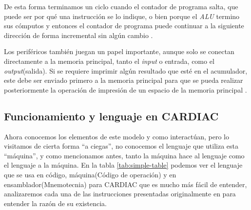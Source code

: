 \documentclass[letterpaper,12pt,oneside]{book}
\begin{document}
	De esta forma terminamos un ciclo cuando el contador de programa salta, que puede ser por qué una instrucción se lo indique, o bien porque
	el \textit{ALU} termino sus cómputos y entonces el contador de programa puede continuar a la siguiente dirección de forma incremental
	sin algún cambio \cite{hegelbarger_instruction_1968}.
	
	Los periféricos también juegan un papel importante, aunque solo se conectan directamente a la memoria principal, tanto el \textit{input} o entrada,
	como el \textit{output}(salida). Si se requiere imprimir algún resultado que esté en el acumulador, este debe ser enviado primero
	a la memoria principal para que se pueda realizar posteriormente la operación de impresión de un espacio de la memoria principal 
	\cite{hegelbarger_instruction_1968}.
	
	\subsection{Funcionamiento y lenguaje en CARDIAC}	
	
	Ahora conocemos los elementos de este modelo y como interactúan, pero lo visitamos de cierta forma ``a ciegas'', no conocemos el lenguaje
	que utiliza esta ``máquina'', y como mencionamos antes, tanto la máquina hace al lenguaje como el lenguaje a la máquina. En la tabla \ref{tab:simple-table} podemos ver el lenguaje que se usa en código, máquina(Código de operación) y 
	en 	ensamblador(Mnemotecnia) para CARDIAC que es mucho más fácil de entender, analizaremos cada una de las instrucciones presentadas
	originalmente en \cite{hegelbarger_instruction_1968} para entender la razón de su 
	existencia.
	
\end{document}
